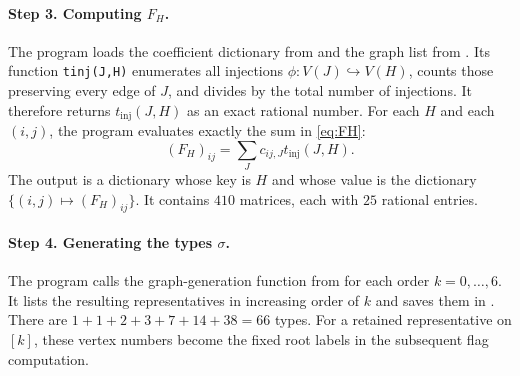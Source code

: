 \documentclass[11pt]{article}
\begin{document}
\paragraph{Step 3. Computing $F_H$.}
The program \href{https://github.com/Diudiutse/triangle-free-signless-laplacian/blob/main/programs/03_compute_F_H.py}{} loads the coefficient dictionary from
\href{https://github.com/Diudiutse/triangle-free-signless-laplacian/blob/main/programs/results/01/c_ij_J.pkl}{} and the graph list from
\href{https://github.com/Diudiutse/triangle-free-signless-laplacian/blob/main/programs/results/02/tau_8.pkl}{}.
Its function \texttt{tinj(J,H)} enumerates all injections
$\phi:V(J)\hookrightarrow V(H)$, counts those preserving every edge of $J$,
and divides by the total number of injections.
It therefore returns $t_{\mathrm{inj}}(J,H)$ as an exact rational number.
For each $H$ and each $(i,j)$, the program evaluates exactly the sum
in \eqref{eq:FH}:
\[
(F_H)_{ij}=\sum_Jc_{ij,J}t_{\mathrm{inj}}(J,H).
\]
The output \href{https://github.com/Diudiutse/triangle-free-signless-laplacian/blob/main/programs/results/03/F_H.pkl}{} is a dictionary whose key is $H$ and
whose value is the dictionary $\{(i,j)\mapsto(F_H)_{ij}\}$.
It contains $410$ matrices, each with $25$ rational entries.

\paragraph{Step 4. Generating the types $\sigma$.}
The program \href{https://github.com/Diudiutse/triangle-free-signless-laplacian/blob/main/programs/04_generate_sigma.py}{} calls the graph-generation
function from \href{https://github.com/Diudiutse/triangle-free-signless-laplacian/blob/main/programs/02_generate_tau8.py}{} for each order $k=0,\ldots,6$.
It lists the resulting representatives in increasing order of $k$ and
saves them in \href{https://github.com/Diudiutse/triangle-free-signless-laplacian/blob/main/programs/results/04/sigma_list.pkl}{}.
There are $1+1+2+3+7+14+38=66$ types.
For a retained representative on $[k]$, these vertex numbers become the
fixed root labels in the subsequent flag computation.
\end{document}
